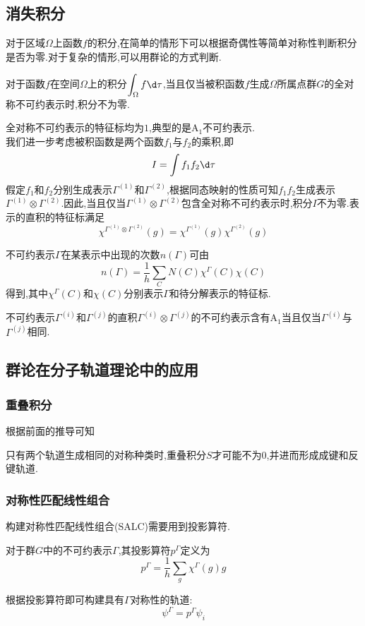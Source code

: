 \documentclass{ctexbook}
\begin{document}
\subsection{消失积分}
对于区域$\Omega$上函数$f$的积分,在简单的情形下可以根据奇偶性等简单对称性判断积分是否为零.对于复杂的情形,可以用群论的方式判断.
\begin{theorem}[用群论判断消失积分]
    对于函数$f$在空间$\Omega$上的积分$\displaystyle\int_{\Omega}f\d\tau$,当且仅当被积函数$f$生成$\Omega$所属点群$G$的全对称不可约表示时,积分不为零.
\end{theorem}
全对称不可约表示的特征标均为$1$,典型的是$\text{A}_1$不可约表示.\\
\indent 我们进一步考虑被积函数是两个函数$f_1$与$f_2$的乘积,即
\[I=\int f_1f_2\d\tau\]
假定$f_1$和$f_2$分别生成表示$\Gamma^{(1)}$和$\Gamma^{(2)}$,根据同态映射的性质可知$f_1f_2$生成表示$\Gamma^{(1)}\otimes\Gamma^{(2)}$.因此,当且仅当$\Gamma^{(1)}\otimes\Gamma^{(2)}$包含全对称不可约表示时,积分$I$不为零.表示的直积的特征标满足
\[\chi^{\Gamma^{(1)}\otimes\Gamma^{(2)}}(g)=\chi^{\Gamma^{(1)}}(g)\chi^{\Gamma^{(2)}}(g)\]
\begin{theorem}[广义正交定理]
    不可约表示$\Gamma$在某表示中出现的次数$n(\Gamma)$可由
    \[n(\Gamma)=\dfrac{1}{h}\sum_{C}N(C)\chi^{\Gamma}(C)\chi(C)\]
    得到,其中$\chi^{\Gamma}(C)$和$\chi(C)$分别表示$\Gamma$和待分解表示的特征标.
\end{theorem}
\begin{theorem}[不可约表示的直积与全对称表示的关系]
    不可约表示$\Gamma^{(i)}$和$\Gamma^{(j)}$的直积$\Gamma^{(i)}\otimes\Gamma^{(j)}$的不可约表示含有$\text{A}_1$当且仅当$\Gamma^{(i)}$与$\Gamma^{(j)}$相同.
\end{theorem}
\subsection{群论在分子轨道理论中的应用}
\subsubsection{重叠积分}
根据前面的推导可知
\begin{theorem}[对称性相同的轨道才能有非零重叠]
    只有两个轨道生成相同的对称种类时,重叠积分$S$才可能不为$0$,并进而形成成键和反键轨道.
\end{theorem}
\subsubsection{对称性匹配线性组合}
构建对称性匹配线性组合(SALC)需要用到投影算符.
\begin{definition}[投影算符]
    对于群$G$中的不可约表示$\Gamma$,其投影算符$p^{\Gamma}$定义为
    \[p^{\Gamma}=\dfrac{1}{h}\sum_{g}\chi^{\Gamma}(g)g\]
\end{definition}
根据投影算符即可构建具有$\Gamma$对称性的轨道:
\[\psi^{\Gamma}=p^{\Gamma}\psi_i\]
\end{document}
